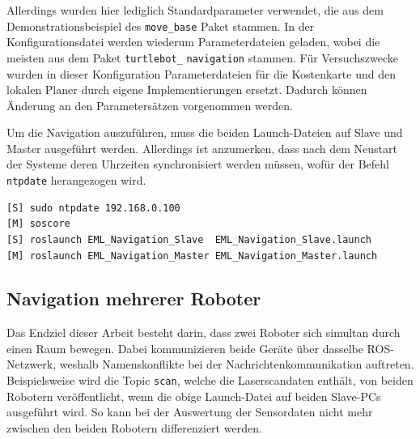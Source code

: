Allerdings wurden hier lediglich Standardparameter verwendet, die aus dem Demonstrationsbeispiel des \lstinline{move_base}{} \cite{WikiMoveBase} Paket stammen. In der Konfigurationsdatei werden wiederum Parameterdateien geladen, wobei die meisten aus dem Paket \lstinline{turtlebot_} \lstinline{navigation}{} \cite{WikiTBNavigation} stammen. Für Versuchszwecke wurden in dieser Konfiguration Parameterdateien für die Kostenkarte und den lokalen Planer durch eigene Implementierungen ersetzt. Dadurch können Änderung an den Parametersätzen vorgenommen werden.

Um die Navigation auszuführen, muss die beiden Launch-Dateien auf Slave und Master ausgeführt werden. Allerdings ist anzumerken, dass nach dem Neustart der Systeme deren Uhrzeiten synchronisiert werden müssen, wofür der Befehl \lstinline{ntpdate}{} herangezogen wird.
\begin{lstlisting}[caption={Anleitung Navigation eines Roboters},captionpos=b]
[S] sudo ntpdate 192.168.0.100
[M] soscore
[S] roslaunch EML_Navigation_Slave  EML_Navigation_Slave.launch
[M] roslaunch EML_Navigation_Master EML_Navigation_Master.launch
\end{lstlisting}

\subsection{Navigation mehrerer Roboter}
Das Endziel dieser Arbeit besteht darin, dass zwei Roboter sich simultan durch einen Raum bewegen. Dabei kommunizieren beide Geräte über dasselbe ROS-Netzwerk, weshalb Namenskonflikte bei der Nachrichtenkommunikation auftreten. Beispielsweise wird die Topic \lstinline{scan}{}, welche die Laserscandaten enthält, von beiden Robotern veröffentlicht, wenn die obige Launch-Datei auf beiden Slave-PCs ausgeführt wird. So kann bei der Auswertung der Sensordaten nicht mehr zwischen den beiden Robotern differenziert werden.

